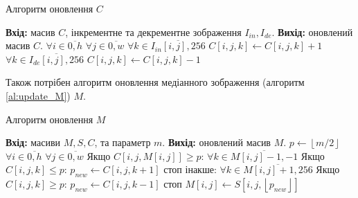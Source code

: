 \begin{algorithm}[H]
    \caption{Алгоритм оновлення $C$}
    \begin{algorithmic}
        \State \textbf{Вхід:} масив $C$, інкрементне та декрементне зображення $I_{in}, I_{de}$.
        \State \textbf{Вихід:} оновлений масив $C$.
        \State $\forall i \in \overline{0,h}$
        \State \qquad  $\forall j \in \overline{0,w}$
        \State \qquad \qquad $\forall k \in \overline{I_{in}[i,j],256}$
        \State \qquad \qquad \qquad $C[i,j,k] \gets C[i,j,k] + 1$
        \State \qquad \qquad $\forall k \in \overline{I_{de}[i,j],256}$
        \State \qquad \qquad \qquad $C[i,j,k] \gets C[i,j,k] - 1$
    \end{algorithmic}
    \label{al:update_C}
\end{algorithm}

Також потрібен алгоритм оновлення медіанного зображення (алгоритм \ref{al:update_M}) $M$.

\begin{algorithm}[H]
    \caption{Алгоритм оновлення $M$}
    \begin{algorithmic}
        \State \textbf{Вхід:} масиви $M, S, C$, та параметр $m$.
        \State \textbf{Вихід:} оновлений масив $M$.
        \State $p \gets \left\lfloor m/2 \right\rfloor$ 
        \State $\forall i \in \overline{0,h}$
        \State \qquad  $\forall j \in \overline{0,w}$
        \State \qquad \qquad  Якщо $C[i,j, M[i,j]] \geq p$:
        \State \qquad \qquad \qquad $\forall k \in \overline{M[i,j]-1,-1}$
        \State \qquad \qquad \qquad \qquad  Якщо $C[i,j,k] \leq p$:
        \State \qquad \qquad \qquad \qquad \qquad $p_{new} \gets C[i,j,k+1]$
        \State \qquad \qquad \qquad \qquad \qquad стоп
        \State \qquad \qquad інакше:
        \State \qquad \qquad \qquad $\forall k \in \overline{M[i,j]+1,256}$
        \State \qquad \qquad \qquad \qquad  Якщо $C[i,j,k] \geq p$:
        \State \qquad \qquad \qquad \qquad \qquad $p_{new} \gets C[i,j,k-1]$
        \State \qquad \qquad \qquad \qquad \qquad стоп
        \State \qquad \qquad $M[i,j] \gets S[i,j, \left\lfloor p_{new}\right\rfloor ]$
    \end{algorithmic}
    \label{al:update_M}
\end{algorithm}

